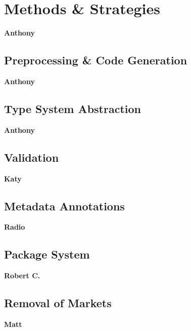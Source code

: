 \section{Methods \& Strategies}

\textbf{Anthony}

\subsection{Preprocessing \& Code Generation}

\textbf{Anthony}

\subsection{Type System Abstraction}

\textbf{Anthony}

\subsection{Validation}

\textbf{Katy}

\subsection{Metadata Annotations}

\textbf{Radio}

\subsection{Package System}

\textbf{Robert C.}

\subsection{Removal of Markets}

\textbf{Matt}
